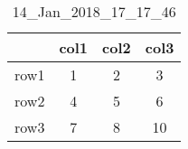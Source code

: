 \begin{table}[h!] 
\begin{center} 
\begin{tabular}{ l  c  c  c} \hline  
 & \textbf{ col1 }  & \textbf{ col2 }  & \textbf{ col3 } \\ \hline  
 row1 & 1  & 2  & 3 \\  
 row2 & 4  & 5  & 6 \\  
 row3 & 7  & 8  & 10 \\  
\hline \hline  
\end{tabular}  
\end{center}  
\caption{ 14\_Jan\_2018\_17\_17\_46 } 
\label{ 14_Jan_2018_17_17_46 } 
\end{table}  
